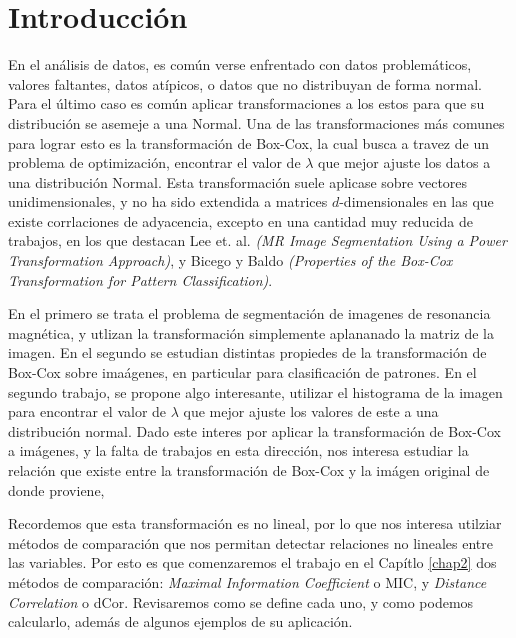 \chapter{Introducci\'on}\label{chap1}

En el an\'alisis de datos, es com\'un verse enfrentado con datos problem\'aticos, valores faltantes, datos at\'ipicos, o datos que no distribuyan de forma normal. Para el \'ultimo caso es com\'un aplicar transformaciones a los estos para que su distribuci\'on se asemeje a una Normal. Una de las transformaciones m\'as comunes para lograr esto es la transformaci\'on de Box-Cox, la cual busca a travez de un problema de optimizaci\'on, encontrar el valor de $\lambda$ que mejor ajuste los datos a una distribuci\'on Normal. Esta transformaci\'on suele aplicase sobre  vectores unidimensionales, y no ha sido extendida a matrices $d$-dimensionales en las que existe corrlaciones de adyacencia, excepto en una cantidad muy reducida de trabajos, en los que destacan Lee et. al. \textit{(MR Image Segmentation Using a Power Transformation Approach)}\cite{lee2009mr}, y Bicego y Baldo \textit{(Properties of the Box-Cox Transformation for Pattern Classification)}\cite{bicego2016}. 

En el primero se trata el problema de segmentaci\'on de imagenes de resonancia magn\'etica, y utlizan la transformaci\'on simplemente aplananado la matriz de la imagen. En el segundo se estudian distintas propiedes de la transformaci\'on de Box-Cox sobre ima\'agenes, en particular para clasificaci\'on de patrones. En el segundo trabajo, se propone algo interesante, utilizar el histograma de la imagen para encontrar el valor de $\lambda$ que mejor ajuste los valores de este a una distribuci\'on normal. Dado este interes por aplicar la transformaci\'on de Box-Cox a im\'agenes, y la falta de trabajos en esta direcci\'on, nos interesa estudiar la relaci\'on que existe entre la transformaci\'on de Box-Cox y la im\'agen original de donde proviene,

Recordemos que esta transformaci\'on es no lineal, por lo que nos interesa utilziar m\'etodos de comparaci\'on que nos permitan detectar relaciones no lineales entre las variables. Por esto es que comenzaremos el trabajo en el Cap\'itlo \ref{chap2} dos m\'etodos de comparaci\'on: \textit{Maximal Information Coefficient} o MIC, y \textit{Distance Correlation} o dCor. Revisaremos como se define cada uno, y como podemos calcularlo, adem\'as de algunos ejemplos de su aplicaci\'on.

